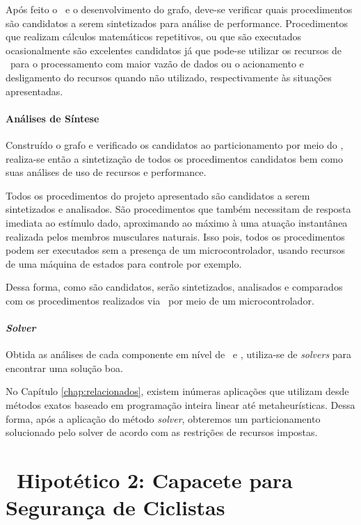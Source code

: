       Após feito o \profile\ e o desenvolvimento do grafo, deve-se verificar quais procedimentos são candidatos a serem sintetizados para análise de performance.
      Procedimentos que realizam cálculos matemáticos repetitivos, ou que são executados ocasionalmente são excelentes candidatos já que pode-se utilizar os recursos de \hardware\ para o processamento com maior vazão de dados ou o acionamento e desligamento do recursos quando não utilizado, respectivamente às situações apresentadas.

      \paragraph{Análises de Síntese}
         Construído o grafo e verificado os candidatos ao particionamento por meio do \profile, realiza-se então a sintetização de todos os procedimentos candidatos bem como suas análises de uso de recursos e performance.
         
         Todos os procedimentos do projeto apresentado são candidatos a serem sintetizados e analisados.
         São procedimentos que também necessitam de resposta imediata ao estímulo dado, aproximando ao máximo à uma atuação instantânea realizada pelos membros musculares naturais.
         Isso pois, todos os procedimentos podem ser executados sem a presença de um microcontrolador, usando recursos de uma máquina de estados para controle por exemplo.
         
         Dessa forma, como são candidatos, serão sintetizados, analisados e comparados com os procedimentos realizados via \software\ por meio de um microcontrolador.
         
      \paragraph{\textit{Solver}}
         Obtida as análises de cada componente em nível de \software\ e \hardware, utiliza-se de \textit{solvers} para encontrar uma solução boa.
         
         No Capítulo \ref{chap:relacionados}, existem inúmeras aplicações que utilizam desde métodos exatos baseado em programação inteira linear até metaheurísticas.
         Dessa forma, após a aplicação do método \textit{solver}, obteremos um particionamento solucionado pelo solver de acordo com as restrições de recursos impostas.


   \section{\Wearable\ Hipotético 2: Capacete para Segurança de Ciclistas} \label{sec:hip2}
